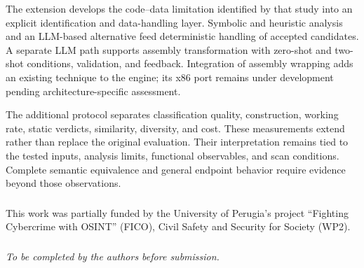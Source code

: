 \documentclass[runningheads]{llncs}
\newif\ifworkingdraft
\newcommand{\draftnote}[1]{\ifworkingdraft\par\smallskip\noindent
 {\color{draftblue}\small\textbf{Draft note.} #1}\par\smallskip\fi}
\begin{document}
The extension develops the code--data limitation identified by that
study into an explicit identification and data-handling layer.
Symbolic and heuristic analysis and an LLM-based alternative feed
deterministic handling of accepted candidates. A separate LLM path
supports assembly transformation with zero-shot and two-shot
conditions, validation, and feedback. Integration of assembly wrapping
adds an existing technique to the engine; its x86 port remains under
development pending architecture-specific assessment.

The additional protocol separates classification quality, construction,
working rate, static verdicts, similarity, diversity, and cost. These
measurements extend rather than replace the original evaluation.
Their interpretation remains tied to the tested inputs, analysis
limits, functional observables, and scan conditions. Complete semantic
equivalence and general endpoint behavior require evidence beyond
those observations.
\draftnote{Add the principal completed extension findings here and in
the abstract. Keep the original findings and update the x86 status only
after its campaign is finalized.}

\begin{credits}
\subsubsection{\ackname}
This work was partially funded by the University of Perugia's project ``Fighting Cybercrime with OSINT'' (FICO), Civil Safety and Security for Society (WP2).

\subsubsection{\discintname}
\emph{To be completed by the authors before submission.}
\end{credits}



\end{document}
